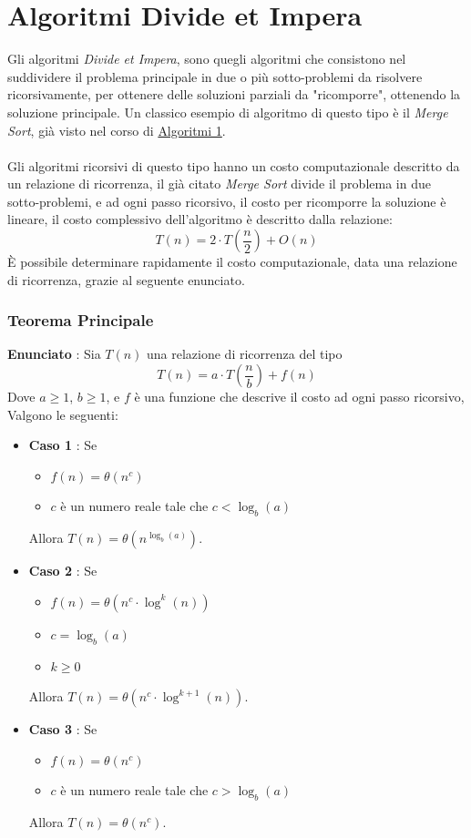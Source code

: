 \documentclass[12pt, letterpaper]{article}
\newcommand{\acc}{\\\hphantom{}\\}
\begin{document}
\section{Algoritmi Divide et Impera}
Gli algoritmi \textit{Divide et Impera}, sono quegli algoritmi che consistono nel suddividere il problema principale 
in due o più sotto-problemi da risolvere ricorsivamente, per ottenere delle soluzioni parziali da "ricomporre", ottenendo
la soluzione principale. Un classico esempio di algoritmo di questo tipo è il \textit{Merge Sort}, già visto nel corso 
di 
\color{blue}\href{https://github.com/CasuFrost/University_notes/blob/main/Primo%20Anno/Secondo%20Semestre/Introduzione%20agli%20algoritmi/Introduzione%20agli%20Algoritmi.pdf}{Algoritmi 1}.
\color{black}\acc 
Gli algoritmi ricorsivi di questo tipo hanno un costo computazionale descritto da un relazione di ricorrenza, il già citato \textit{Merge Sort} 
divide il problema in due sotto-problemi, e ad ogni passo ricorsivo, il costo per ricomporre la soluzione è lineare, il costo complessivo 
dell'algoritmo è descritto dalla relazione: 
$$ T(n)=2\cdot T(\dfrac{n}{2})+O(n) $$ 
È possibile determinare rapidamente il costo computazionale, data una relazione di ricorrenza, grazie al seguente enunciato. 
\subsubsection{Teorema Principale}\label{tp}
\textbf{Enunciato } : Sia $T(n)$ una relazione di ricorrenza del tipo 
$$ T(n)=a\cdot T(\dfrac{n}{b})+f(n)$$
Dove
   $a\ge 1$,
   $b\ge 1$,
    e $f$ è una funzione che descrive il costo ad ogni passo ricorsivo, 
Valgono le seguenti:\begin{itemize}
    \item \textbf{Caso 1} : Se \begin{itemize}
        \item $f(n)=\theta(n^c)$
        \item $c$ è un numero reale tale che $c<\log_b(a)$
    \end{itemize}
    Allora $T(n)=\theta(n^{\log_b(a)})$.
    \item \textbf{Caso 2} : Se \begin{itemize}
        \item $f(n)=\theta(n^c\cdot \log^k(n))$
        \item $c=\log_b(a)$
        \item $k\ge 0$
    \end{itemize}
    Allora $T(n)=\theta(n^c\cdot \log^{k+1}(n))$.
    \item \textbf{Caso 3} : Se \begin{itemize}
        \item $f(n)=\theta(n^c)$
        \item $c$ è un numero reale tale che $c>\log_b(a)$
    \end{itemize}
    Allora $T(n)=\theta(n^c)$.
\end{itemize}
\end{document}
